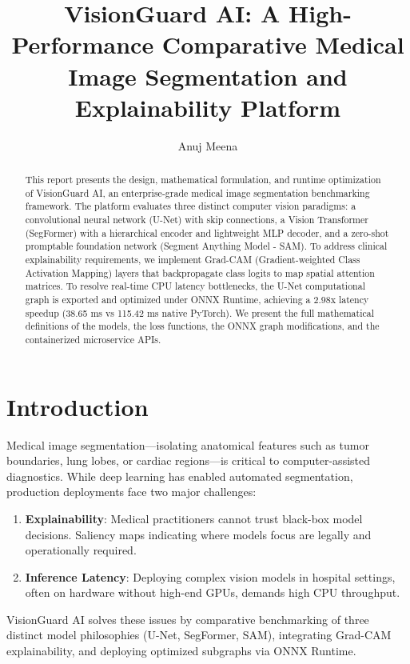 \documentclass[11pt,journal,onecolumn]{IEEEtran}
\begin{document}
\title{VisionGuard AI: A High-Performance Comparative Medical Image Segmentation and Explainability Platform}
\author{Anuj Meena}
\maketitle

\begin{abstract}
This report presents the design, mathematical formulation, and runtime optimization of VisionGuard AI, an enterprise-grade medical image segmentation benchmarking framework. The platform evaluates three distinct computer vision paradigms: a convolutional neural network (U-Net) with skip connections, a Vision Transformer (SegFormer) with a hierarchical encoder and lightweight MLP decoder, and a zero-shot promptable foundation network (Segment Anything Model - SAM). To address clinical explainability requirements, we implement Grad-CAM (Gradient-weighted Class Activation Mapping) layers that backpropagate class logits to map spatial attention matrices. To resolve real-time CPU latency bottlenecks, the U-Net computational graph is exported and optimized under ONNX Runtime, achieving a 2.98x latency speedup (38.65 ms vs 115.42 ms native PyTorch). We present the full mathematical definitions of the models, the loss functions, the ONNX graph modifications, and the containerized microservice APIs.
\end{abstract}

\section{Introduction}
Medical image segmentation—isolating anatomical features such as tumor boundaries, lung lobes, or cardiac regions—is critical to computer-assisted diagnostics. While deep learning has enabled automated segmentation, production deployments face two major challenges:
\begin{enumerate}
    \item \textbf{Explainability}: Medical practitioners cannot trust black-box model decisions. Saliency maps indicating where models focus are legally and operationally required.
    \item \textbf{Inference Latency}: Deploying complex vision models in hospital settings, often on hardware without high-end GPUs, demands high CPU throughput.
\end{enumerate}

VisionGuard AI solves these issues by comparative benchmarking of three distinct model philosophies (U-Net, SegFormer, SAM), integrating Grad-CAM explainability, and deploying optimized subgraphs via ONNX Runtime.
\end{document}
